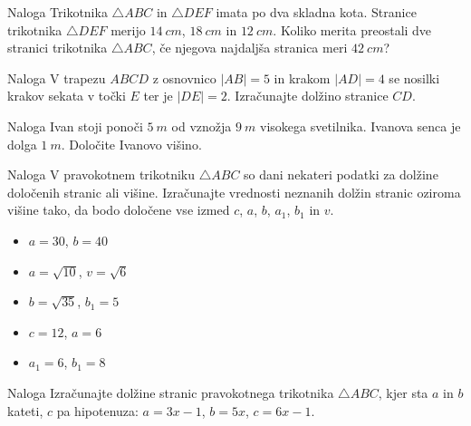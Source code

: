         \begin{frame}
            \begin{exampleblock}{Naloga}
                Trikotnika $\triangle ABC$ in $\triangle DEF$ imata po dva skladna kota. 
                Stranice trikotnika $\triangle DEF$ merijo $14~cm$, $18~cm$ in $12~cm$.
                Koliko merita preostali dve stranici trikotnika $\triangle ABC$, 
                če njegova najdaljša stranica meri $42~cm$?
            \end{exampleblock}

            \begin{exampleblock}{Naloga}
                V trapezu $ABCD$ z osnovnico $|AB|=5$ in krakom $|AD|=4$ se nosilki krakov sekata v točki $E$ ter je $|DE|=2$.
                Izračunajte dolžino stranice $CD$.
            \end{exampleblock}

            \begin{exampleblock}{Naloga}
                Ivan stoji ponoči $5~m$ od vznožja $9~m$ visokega svetilnika. 
                Ivanova senca je dolga $1~m$.
                Določite Ivanovo višino.
            \end{exampleblock}

        \end{frame}


        \begin{frame}
            \begin{exampleblock}{Naloga}
                V pravokotnem trikotniku $\triangle ABC$ so dani nekateri podatki za dolžine določenih stranic ali višine.
                Izračunajte vrednosti neznanih dolžin stranic oziroma višine tako, da bodo določene vse izmed $c$, $a$, $b$, $a_1$, $b_1$ in $v$.
                \begin{itemize}
                    \item $a=30$, $b=40$
                    \item $a=\sqrt{10}$, $v=\sqrt{6}$
                    \item $b=\sqrt{35}$, $b_1=5$
                    \item $c=12$, $a=6$
                    \item $a_1=6$, $b_1=8$
                \end{itemize}
            \end{exampleblock}

            \begin{exampleblock}{Naloga}
                Izračunajte dolžine stranic pravokotnega trikotnika $\triangle ABC$, kjer sta $a$ in $b$ kateti, $c$ pa hipotenuza:
                $a=3x-1$, $b=5x$, $c=6x-1$.
            \end{exampleblock}

        \end{frame}
       

